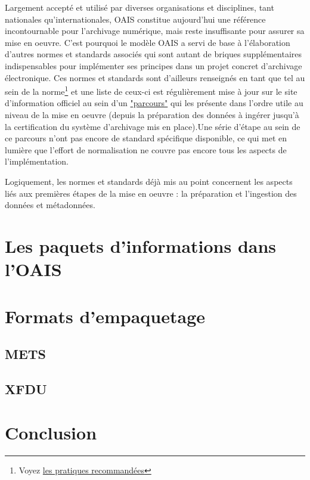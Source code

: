 \documentclass[12pt,a4paper]{article} %
\begin{document}
Largement accepté et utilisé  par diverses organisations et disciplines, tant nationales qu'internationales, OAIS constitue aujourd'hui une référence incontournable pour l'archivage numérique, mais reste insuffisante pour assurer sa mise en oeuvre. C'est pourquoi le modèle OAIS a servi de base à l'élaboration d'autres normes et standards associés qui sont autant de briques supplémentaires indispensables pour implémenter ses principes dans un projet concret d'archivage électronique. Ces normes et standards sont d'ailleurs renseignés en tant que tel au sein de la norme\footnote{Voyez \href{https://public.ccsds.org/Pubs/650x0m2(F).pdf}{les pratiques recommandées}} et une liste de ceux-ci est régulièrement mise à jour sur le site d'information officiel au sein d'un \href{http://www.oais.info/standards-process/oais-roadmap-and-related-standards/}{"parcours"} qui les présente dans l'ordre utile au niveau de la mise en oeuvre (depuis la préparation des données à ingérer jusqu'à la certification du système d'archivage mis en place).Une série d'étape au sein de ce parcours n'ont pas encore de standard spécifique disponible, ce qui met en lumière que l'effort de normalisation ne couvre pas encore tous les aspects de l'implémentation.

Logiquement, les normes et standards déjà mis au point concernent les aspects liés aux premières étapes de la mise en oeuvre : la préparation et l'ingestion des données et métadonnées. 


\section{Les paquets d'informations dans l'OAIS}

\section{Formats d'empaquetage}

\subsection{METS}

\subsection{XFDU}

\section{Conclusion}


\printbibliography

\tableofcontents %
\end{document}
